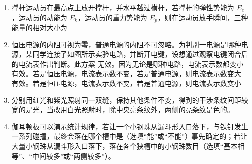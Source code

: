 \documentclass[\gkver]{gaokaozhenti}
\begin{document}
\begin{enumerate}
\item
撑杆运动员在最高点上放开撑杆，并水平越过横杆，若撑杆的弹性势能为 $E_{e}$，运动员的动能为 $E_{k}$，运动员的重力势能为 $E_{p}$，则在运动员放手瞬间，三种能量的相对大小为
\fourchoices[answer=B, ispicture=true, hA=1.96cm, hB=2.02cm, hC=2.02cm, hD=2.60cm]
{}
{}
{}
{}

\item
恒压电源的内阻可视为零，普通电源的内阻不可忽略。为判别一电源是哪种电源，某同学连接了如图所示实验电路，并断开电键，设想通过观察电键闭合后的电流表作出判断。此方案
\onepicture[align=right, h=3.27cm]{}
{无效。因为无论是哪种电路，电流表示数都变小}
{有效。若是恒压电源，电流表示数不变，若是普通电源，则电流表示数变大}
{有效。若是恒压电源，电流表示数不变，若是普通电源，则电流表示数变小}

\item
分别用红光和紫光照射同一双缝，保持其他条件不变，得到的干涉条纹间距较宽的是光，当改用白光照射时，除中央亮条纹外，两侧的亮条纹是色的。

\item
伽耳顿板可以演示统计规律，若让一个小钢珠从漏斗形入口落下，与铁钉发生一系列碰撞，最终会落在哪个槽中是（选填“能”或“不能”）事先确定的；若让大量小钢珠从漏斗形入口落下，落在各个狭槽中的小钢珠数目（选填“基本相等”、“中间较多”或“两侧较多”）。
\onepicture[align=right, h=2.97cm]{}


\end{enumerate}
\end{document}

